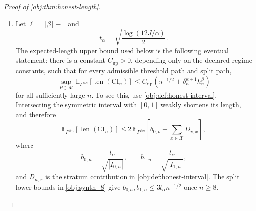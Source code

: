 \begin{proof}[Proof of \cref{obj:thm:honest-length}]
\begin{enumerate}
\item Let \(\ell=\lceil\beta\rceil-1\) and
\[
t_\alpha=\sqrt{\frac{\log(12J/\alpha)}{2}} .
\]
The expected-length upper bound used below is the following eventual statement: there is a constant
\(C_{\mathrm{up}}>0\), depending only on the declared regime constants, such that for every admissible
threshold path and split path,
\[
\sup_{P\in\mathcal M}
\mathbb E_{P^{\otimes n}}
\!\left[\operatorname{len}(\mathrm{CI}_n)\right]
\le
C_{\mathrm{up}}
\left(n^{-1/2}+\delta_n^{\kappa+1}h_n^\beta\right)
\]
for all sufficiently large \(n\). To see this, use \cref{obj:def:honest-interval}. Intersecting the
symmetric interval with \([0,1]\) weakly shortens its length, and therefore
\[
\mathbb E_{P^{\otimes n}}\!\left[\operatorname{len}(\mathrm{CI}_n)\right]
\le
2\,\mathbb E_{P^{\otimes n}}\!\left[
 b_{0,n}+\sum_{x\in\mathcal X}D_{n,x}\right],
\]
where
\[
b_{0,n}=\frac{t_\alpha}{\sqrt{|I_{0,n}|}},
\qquad
b_{1,n}=\frac{t_\alpha}{\sqrt{|I_{1,n}|}},
\]
and \(D_{n,x}\) is the stratum contribution in \cref{obj:def:honest-interval}. The split lower bounds
in \cref{obj:synth_8} give \(b_{0,n},b_{1,n}\le 3t_\alpha n^{-1/2}\) once \(n\ge8\).


\end{enumerate}
\end{proof}
